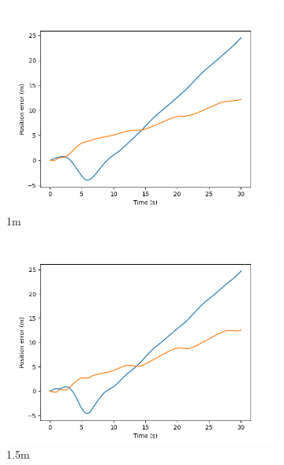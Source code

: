 \documentclass[class=article, crop=false]{standalone}
\begin{document}
\begin{figure}
\begin{subfigure}[b]{0.48\textwidth}
        \includegraphics{scenario1/rov-50m/1.0m/usv_pos_error_controlled}
        \caption{1m}
        \label{}
    \end{subfigure}
    \hfill
        \begin{subfigure}[b]{0.48\textwidth}
        \centering
        \includegraphics{scenario1/rov-50m/1.5m/usv_pos_error_controlled}
        \caption{1.5m}
        \label{}
    \end{subfigure}
    \vfill
        \begin{subfigure}[b]{0.48\textwidth}
        \centering

\end{subfigure}
\end{figure}
\end{document}
